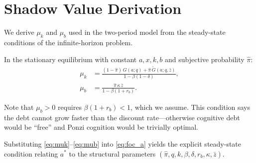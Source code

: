 \documentclass[12pt]{article}
\newcommand{\hpi}{\hat{\pi}}
\begin{document}
\section{Shadow Value Derivation}
\label{app:shadow}

We derive $\mu_k$ and $\mu_b$ used in the two-period model from the steady-state
conditions of the infinite-horizon problem.

In the stationary equilibrium with constant $a, x, k, b$ and subjective probability
$\hpi$:
\begin{align}
\mu_k &= \frac{(1-\hpi)\,G(a;q) + \hpi\,\tilde{G}(a;q,\bar{z})}{1 - \beta(1-\delta)}, \label{eq:muk}\\
\mu_b &= \frac{\hpi\,\kappa\,\bar{z}}{1 - \beta(1+r_b)}. \label{eq:mub}
\end{align}

Note that $\mu_b > 0$ requires $\beta(1+r_b) < 1$, which we assume. This condition
says the debt cannot grow faster than the discount rate---otherwise cognitive debt would
be ``free'' and Ponzi cognition would be trivially optimal.

Substituting \eqref{eq:muk}--\eqref{eq:mub} into \eqref{eq:foc_a} yields the
explicit steady-state condition relating $a^*$ to the structural parameters
$(\hpi, q, k, \beta, \delta, r_b, \kappa, \bar{z})$.
\end{document}

